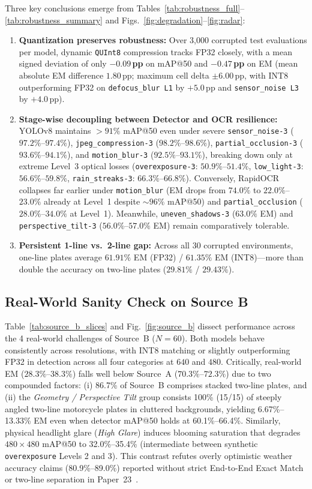 \documentclass[pdflatex,sn-mathphys-num]{sn-jnl}
\begin{document}
Three key conclusions emerge from Tables~\ref{tab:robustness_full}--\ref{tab:robustness_summary} and Figs.~\ref{fig:degradation}--\ref{fig:radar}:
\begin{enumerate}
    \item \textbf{Quantization preserves robustness:} Over 3,000 corrupted test evaluations per model, dynamic \texttt{QUInt8} compression tracks FP32 closely, with a mean signed deviation of only \textbf{$-0.09$\,pp} on mAP@50 and \textbf{$-0.47$\,pp} on EM (mean absolute EM difference $1.80$\,pp; maximum cell delta $\pm 6.00$\,pp, with INT8 outperforming FP32 on \texttt{defocus\_blur L1} by $+5.0$\,pp and \texttt{sensor\_noise L3} by $+4.0$\,pp).
    \item \textbf{Stage-wise decoupling between Detector and OCR resilience:} YOLOv8 maintains $>91\%$ mAP@50 even under severe \texttt{sensor\_noise-3} ($97.2\%$--$97.4\%$), \texttt{jpeg\_compression-3} ($98.2\%$--$98.6\%$), \texttt{partial\_occlusion-3} ($93.6\%$--$94.1\%$), and \texttt{motion\_blur-3} ($92.5\%$--$93.1\%$), breaking down only at extreme Level~3 optical losses (\texttt{overexposure-3}: $50.9\%$--$51.4\%$, \texttt{low\_light-3}: $56.6\%$--$59.8\%$, \texttt{rain\_streaks-3}: $66.3\%$--$66.8\%$). Conversely, RapidOCR collapses far earlier under \texttt{motion\_blur} (EM drops from $74.0\%$ to $22.0\%$--$23.0\%$ already at Level~1 despite $\sim 96\%$ mAP@50) and \texttt{partial\_occlusion} ($28.0\%$--$34.0\%$ at Level~1). Meanwhile, \texttt{uneven\_shadows-3} ($63.0\%$ EM) and \texttt{perspective\_tilt-3} ($56.0\%$--$57.0\%$ EM) remain comparatively tolerable.
    \item \textbf{Persistent 1-line vs.\ 2-line gap:} Across all 30 corrupted environments, one-line plates average $61.91\%$ EM (FP32) / $61.35\%$ EM (INT8)---more than double the accuracy on two-line plates ($29.81\%$ / $29.43\%$).
\end{enumerate}

\subsection{Real-World Sanity Check on Source B}\label{subsec:exp_sourceb}
Table~\ref{tab:source_b_slices} and Fig.~\ref{fig:source_b} dissect performance across the 4 real-world challenges of Source~B ($N=60$). Both models behave consistently across resolutions, with INT8 matching or slightly outperforming FP32 in detection across all four categories at $640$ and $480$. Critically, real-world EM ($28.3\%$--$38.3\%$) falls well below Source~A ($70.3\%$--$72.3\%$) due to two compounded factors: (i) 86.7\% of Source~B comprises stacked two-line plates, and (ii) the \emph{Geometry / Perspective Tilt} group consists 100\% (15/15) of steeply angled two-line motorcycle plates in cluttered backgrounds, yielding 6.67\%--13.33\% EM even when detector mAP@50 holds at 60.1\%--66.4\%. Similarly, physical headlight glare (\emph{High Glare}) induces blooming saturation that degrades $480\times 480$ mAP@50 to 32.0\%--35.4\% (intermediate between synthetic \texttt{overexposure} Levels 2 and 3). This contrast refutes overly optimistic weather accuracy claims (80.9\%--89.0\%) reported without strict End-to-End Exact Match or two-line separation in Paper~23~\cite{jagtap2025yolo}.
\end{document}
